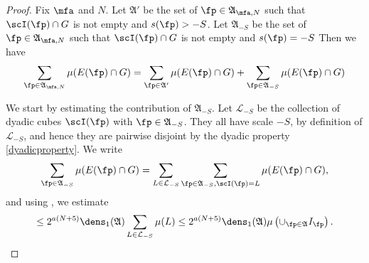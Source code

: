 \begin{proof}
\leanok
{Fix $\mfa$ and $N$. Let
$\mathfrak{A}'$ be the set of $\fp\in\mathfrak{A}_{\mfa,N}$ such that $\scI(\fp)\cap G$ is not empty and $s(\fp) > -S$.
Let $\mathfrak{A}_{-S}$ be the set of $\fp\in\mathfrak{A}_{\mfa,N}$ such that $\scI(\fp)\cap G$ is not empty and $s(\fp) = -S$ }
Then we have
\begin{equation*}
    \sum_{\fp\in\mathfrak{A}_{\mfa,N}}\mu(E(\fp)\cap G) =
    \sum_{\fp\in\mathfrak{A}'}\mu(E(\fp)\cap G) + \sum_{\fp\in\mathfrak{A}_{-S}}\mu(E(\fp)\cap G)
\end{equation*}

We start by estimating the contribution of $\mathfrak{A}_{-S}$. Let $\mathcal{L}_{-S}$ be the
collection of dyadic cubes $\scI(\fp)$ with $\fp \in \mathfrak{A}_{-S}$. They all have scale $-S$,
by definition of $\mathcal{L}_{-S}$, and hence they are pairwise disjoint by the dyadic property
\eqref{dyadicproperty}. We write
\[
    \sum_{\fp\in\mathfrak{A}_{-S}}\mu(E(\fp)\cap G)
    = \sum_{L \in \mathcal{L}_{-S}} \sum_{\fp\in\mathfrak{A}_{-S}, \scI(\fp) = L} \mu(E(\fp)\cap G),
\]
and using , we estimate
\begin{equation}\label{eq_minus_S}
    \le 2^{a(N+5)} \dens_1(\mathfrak{A}) \sum_{L \in \mathcal{L}_{-S}} \mu(L)
    \le 2^{a(N+5)} \dens_1(\mathfrak{A}) \mu\left(\cup_{\fp\in\mathfrak{A}}I_{\fp}\right).
\end{equation}


\end{proof}
